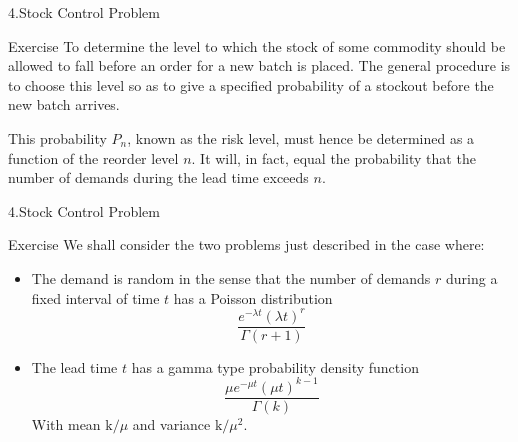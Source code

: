 \documentclass{beamer}
\begin{document}
\begin{frame}{4.Stock Control Problem}
\begin{block}{Exercise}
To determine the level to which the stock of some commodity should be allowed to fall before an order for a new batch is placed. The general procedure is to choose this level so as to give a specified probability of a stockout before the new batch arrives. 

This probability $P_n$, known as the risk level, must hence be determined as a function of the reorder level $n$. It will, in fact, equal the probability that the number of demands during the lead time exceeds $n$.
\end{block}
\end{frame}
\begin{frame}{4.Stock Control Problem}
\begin{block}{Exercise}
We shall consider the two problems just described in the case where:
\begin{itemize}
\item The demand is random in the sense that the number of demands $r$ during a fixed interval of time $t$ has a Poisson distribution
$$
\frac{e^{-\lambda t}(\lambda t)^{r}}{\Gamma(r+1)}
$$
\item The lead time $t$ has a gamma type probability density function
$$
\frac{\mu e^{-\mu t}(\mu t)^{k-1}}{\Gamma(k)}
$$
With mean $\mathrm{k} / \mu$ and variance $\mathrm{k} / \mu^{2}$.
\end{itemize}
\end{block}
\end{frame}
\end{document}
